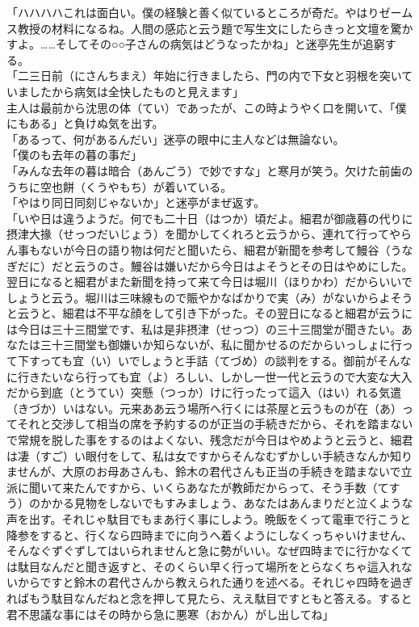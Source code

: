 \documentclass{book}
\begin{document}
「ハハハハこれは面白い。僕の経験と善く似ているところが奇だ。やはりゼームス教授の材料になるね。人間の感応と云う題で写生文にしたらきっと文壇を驚かすよ。\ldots{}\ldots{}そしてその○○子さんの病気はどうなったかね」と迷亭先生が追窮する。\\
「二三日前（にさんちまえ）年始に行きましたら、門の内で下女と羽根を突いていましたから病気は全快したものと見えます」\\
主人は最前から沈思の体（てい）であったが、この時ようやく口を開いて、「僕にもある」と負けぬ気を出す。\\
「あるって、何があるんだい」迷亭の眼中に主人などは無論ない。\\
「僕のも去年の暮の事だ」\\
「みんな去年の暮は暗合（あんごう）で妙ですな」と寒月が笑う。欠けた前歯のうちに空也餅（くうやもち）が着いている。\\
「やはり同日同刻じゃないか」と迷亭がまぜ返す。\\
「いや日は違うようだ。何でも二十日（はつか）頃だよ。細君が御歳暮の代りに摂津大掾（せっつだいじょう）を聞かしてくれろと云うから、連れて行ってやらん事もないが今日の語り物は何だと聞いたら、細君が新聞を参考して鰻谷（うなぎだに）だと云うのさ。鰻谷は嫌いだから今日はよそうとその日はやめにした。翌日になると細君がまた新聞を持って来て今日は堀川（ほりかわ）だからいいでしょうと云う。堀川は三味線もので賑やかなばかりで実（み）がないからよそうと云うと、細君は不平な顔をして引き下がった。その翌日になると細君が云うには今日は三十三間堂です、私は是非摂津（せっつ）の三十三間堂が聞きたい。あなたは三十三間堂も御嫌いか知らないが、私に聞かせるのだからいっしょに行って下すっても宜（い）いでしょうと手詰（てづめ）の談判をする。御前がそんなに行きたいなら行っても宜（よ）ろしい、しかし一世一代と云うので大変な大入だから到底（とうてい）突懸（つっか）けに行ったって這入（はい）れる気遣（きづか）いはない。元来ああ云う場所へ行くには茶屋と云うものが在（あ）ってそれと交渉して相当の席を予約するのが正当の手続きだから、それを踏まないで常規を脱した事をするのはよくない、残念だが今日はやめようと云うと、細君は凄（すご）い眼付をして、私は女ですからそんなむずかしい手続きなんか知りませんが、大原のお母あさんも、鈴木の君代さんも正当の手続きを踏まないで立派に聞いて来たんですから、いくらあなたが教師だからって、そう手数（てすう）のかかる見物をしないでもすみましょう、あなたはあんまりだと泣くような声を出す。それじゃ駄目でもまあ行く事にしよう。晩飯をくって電車で行こうと降参をすると、行くなら四時までに向うへ着くようにしなくっちゃいけません、そんなぐずぐずしてはいられませんと急に勢がいい。なぜ四時までに行かなくては駄目なんだと聞き返すと、そのくらい早く行って場所をとらなくちゃ這入れないからですと鈴木の君代さんから教えられた通りを述べる。それじゃ四時を過ぎればもう駄目なんだねと念を押して見たら、ええ駄目ですともと答える。すると君不思議な事にはその時から急に悪寒（おかん）がし出してね」\\
\end{document}
